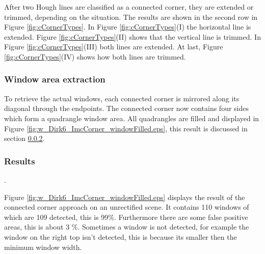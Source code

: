 After two Hough lines are classified as a connected corner, they are extended or
trimmed, depending on the situation. The results are shown in the second row in
Figure \ref{fig:cCornerTypes}.
In Figure \ref{fig:cCornerTypes}(I)  the horizontal line is extended.  Figure
\ref{fig:cCornerTypes}(II) shows that the vertical line is trimmed.  In Figure
\ref{fig:cCornerTypes}(III) both lines are extended.  At last, Figure
\ref{fig:cCornerTypes}(IV) shows how both lines are trimmed.


\subsubsection{Window area extraction}
To retrieve the actual windows, each connected corner is mirrored along its 
diagonal through the endpoints. The connected corner now contains four sides which form a 
quadrangle window area.
All quadrangles are filled and displayed in Figure
\ref{fig:w_Dirk6_ImcCorner_windowFilled.eps}, this result is discussed in section
\ref{sec:results}.


\subsubsection{Results}
\label{sec:results}.


\newpage
{}
\clearpage

Figure \ref{fig:w_Dirk6_ImcCorner_windowFilled.eps} displays the result of the
connected corner approach on an unrectified scene.  It contains 110 windows of
which are 109 detected, this is 99\%. Furthermore there are some false positive
areas, this is about 3 \%.
Sometimes a window is not detected, for example the window on the right top
isn't detected, this is because its smaller then the minimum window width.\\


